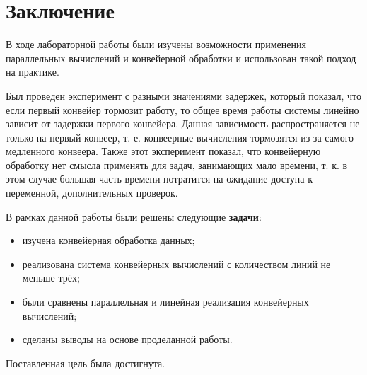 \documentclass[12pt]{report}
\begin{document}
\chapter*{Заключение}
В ходе лабораторной работы были изучены возможности применения параллельных вычислений и конвейерной обработки и использован такой подход на практике. 

Был проведен эксперимент с разными значениями задержек, который показал, что если первый конвейер тормозит работу, то общее время работы системы линейно зависит от задержки первого конвейера. Данная зависимость распространяется не только на первый конвеер, т. е. конвеерные вычисления тормозятся из-за самого медленного конвеера. Также этот эксперимент показал, что конвейерную обработку нет смысла применять для задач, занимающих мало времени, т. к. в этом случае большая часть времени потратится на ожидание доступа к переменной, дополнительных проверок.

В рамках данной работы были решены следующие \textbf{задачи}:

\begin{itemize}
	\item изучена конвейерная обработка данных;
	\item реализована система конвейерных вычислений с количеством линий не меньше трёх;
	\item были сравнены параллельная и линейная реализация конвейерных вычислений;
	\item сделаны выводы на основе проделанной работы.
\end{itemize}

Поставленная цель была достигнута.
\end{document}
